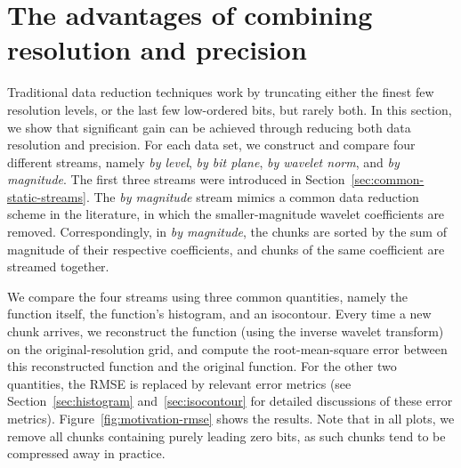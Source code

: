 \section{The advantages of combining resolution and precision}
\label{sec:motivation}

Traditional data reduction techniques work by truncating either the finest few resolution levels, or
the last few low-ordered bits, but rarely both. In this section, we show that significant gain can
be achieved through reducing both data resolution and precision. For each data set, we construct and
compare four different streams, namely \emph{by level}, \emph{by bit plane}, \emph{by wavelet norm},
and \emph{by magnitude}. The first three streams were introduced in
Section~\ref{sec:common-static-streams}. The \emph{by magnitude} stream mimics a common data
reduction scheme in the literature, in which the smaller-magnitude wavelet coefficients are removed.
Correspondingly, in \emph{by magnitude}, the chunks are sorted by the sum of magnitude of their
respective coefficients, and chunks of the same coefficient are streamed together. 

We compare the four streams using three common quantities, namely the function itself, the
function's histogram, and an isocontour. Every time a new chunk arrives, we reconstruct the function
(using the inverse wavelet transform) on the original-resolution grid, and compute the
root-mean-square error between this reconstructed function and the original function. For the other
two quantities, the RMSE is replaced by relevant error metrics (see Section~\ref{sec:histogram}
and~\ref{sec:isocontour} for detailed discussions of these error metrics).
Figure~\ref{fig:motivation-rmse} shows the results. Note that in all plots, we remove all chunks
containing purely leading zero bits, as such chunks tend to be compressed away in practice. 

